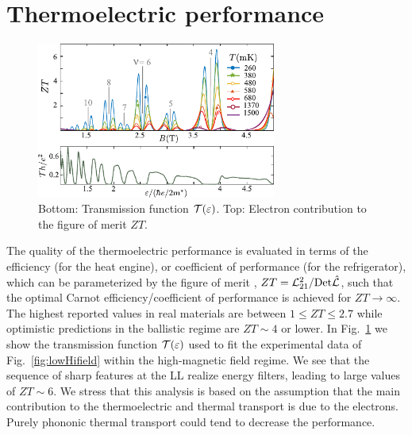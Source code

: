 \section{Thermoelectric performance}

\begin{figure}
    \centering
    \includegraphics[width=0.7\textwidth]{figures/vtpGmodel/termovoltageConductance/fig5.pdf}
    \caption{Bottom: Transmission function ${\cal T}(\varepsilon)$. Top: Electron contribution to the figure of merit $ZT$.}
    \label{fig:ZT}
\end{figure}
The quality of the thermoelectric performance is evaluated in terms of
the efficiency (for the heat engine), 
 or coefficient of performance (for the refrigerator), which can be parameterized by the figure of merit \cite{benenti2016thermal,benenti2017fundamental}, $ZT = {\cal L}_{21}^2/\mbox{Det}{\hat{\cal L}}$,
 such that the optimal Carnot efficiency/coefficient of performance is achieved for $ZT \rightarrow \infty$.
 The highest reported values in real materials are between 
 $1 \leq ZT\leq 2.7$ \cite{benenti2017fundamental} while optimistic predictions in the ballistic regime are
 $ZT \sim 4$ \cite{ozaeta2014predicted} or lower.
 In Fig.~\ref{fig:ZT} we show the transmission function ${\cal T}(\varepsilon)$ used to fit the experimental data of Fig.~\ref{fig:lowHifield} within the high-magnetic field regime. We see that the sequence of sharp features at the LL realize energy filters, leading to large values of  $ZT \sim 6$. 
We stress that this analysis is based on the assumption that the main contribution to the thermoelectric and thermal transport is due to the electrons.
Purely phononic thermal transport could tend to decrease the performance.

